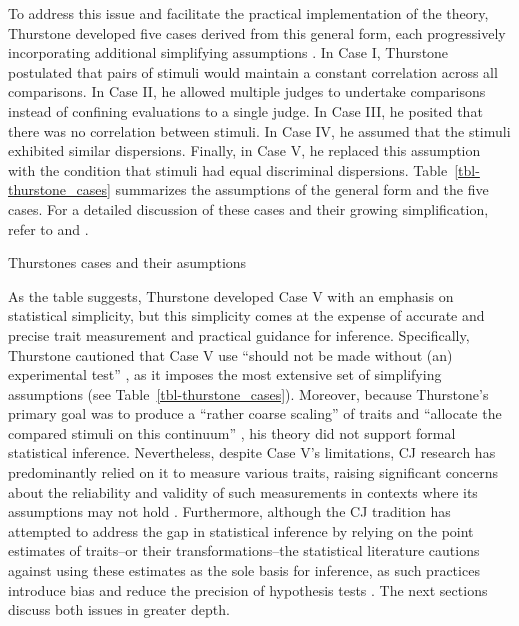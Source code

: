 \documentclass[
  authoryear,
  review,
  1p]{elsarticle}
\begin{document}
To address this issue and facilitate the practical implementation of the
theory, Thurstone developed five cases derived from this general form,
each progressively incorporating additional simplifying assumptions
\citep{Thurstone_1927b}. In Case I, Thurstone postulated that pairs of
stimuli would maintain a constant correlation across all comparisons. In
Case II, he allowed multiple judges to undertake comparisons instead of
confining evaluations to a single judge. In Case III, he posited that
there was no correlation between stimuli. In Case IV, he assumed that
the stimuli exhibited similar dispersions. Finally, in Case V, he
replaced this assumption with the condition that stimuli had equal
discriminal dispersions. Table~\ref{tbl-thurstone_cases} summarizes the
assumptions of the general form and the five cases. For a detailed
discussion of these cases and their growing simplification, refer to
\citet{Thurstone_1927b} and \citet{Bramley_2008}.

\begin{table}

\caption{\label{tbl-thurstone_cases}Thurstones cases and their
asumptions}


\end{table}%

As the table suggests, Thurstone developed Case V with an emphasis on
statistical simplicity, but this simplicity comes at the expense of
accurate and precise trait measurement and practical guidance for
inference. Specifically, Thurstone cautioned that Case V use ``should
not be made without (an) experimental test''
\citep[p.~270]{Thurstone_1927b}, as it imposes the most extensive set of
simplifying assumptions \citep{Bramley_2008, Kelly_et_al_2022} (see
Table~\ref{tbl-thurstone_cases}). Moreover, because Thurstone's primary
goal was to produce a ``rather coarse scaling'' of traits and ``allocate
the compared stimuli on this continuum''
\citep[p.~269]{Thurstone_1927b}, his theory did not support formal
statistical inference. Nevertheless, despite Case V's limitations, CJ
research has predominantly relied on it to measure various traits,
raising significant concerns about the reliability and validity of such
measurements in contexts where its assumptions may not hold
\citep{Kelly_et_al_2022, Andrich_1978}. Furthermore, although the CJ
tradition has attempted to address the gap in statistical inference by
relying on the point estimates of traits--or their transformations--the
statistical literature cautions against using these estimates as the
sole basis for inference, as such practices introduce bias and reduce
the precision of hypothesis tests
\citep{McElreath_2020, Kline_et_al_2023, Hoyle_et_al_2023}. The next
sections discuss both issues in greater depth.
\end{document}
